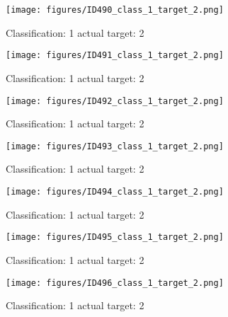\begin{figure}[h!]
\begin{center}
\texttt{[image: figures/ID490\_class\_1\_target\_2.png]}
\end{center}
\caption{ Classification: 1 actual target: 2}
\label{fig:ID490_class_1_target_2}
\end{figure}
\begin{figure}[h!]
\begin{center}
\texttt{[image: figures/ID491\_class\_1\_target\_2.png]}
\end{center}
\caption{ Classification: 1 actual target: 2}
\label{fig:ID491_class_1_target_2}
\end{figure}
\begin{figure}[h!]
\begin{center}
\texttt{[image: figures/ID492\_class\_1\_target\_2.png]}
\end{center}
\caption{ Classification: 1 actual target: 2}
\label{fig:ID492_class_1_target_2}
\end{figure}
\begin{figure}[h!]
\begin{center}
\texttt{[image: figures/ID493\_class\_1\_target\_2.png]}
\end{center}
\caption{ Classification: 1 actual target: 2}
\label{fig:ID493_class_1_target_2}
\end{figure}
\begin{figure}[h!]
\begin{center}
\texttt{[image: figures/ID494\_class\_1\_target\_2.png]}
\end{center}
\caption{ Classification: 1 actual target: 2}
\label{fig:ID494_class_1_target_2}
\end{figure}
\begin{figure}[h!]
\begin{center}
\texttt{[image: figures/ID495\_class\_1\_target\_2.png]}
\end{center}
\caption{ Classification: 1 actual target: 2}
\label{fig:ID495_class_1_target_2}
\end{figure}
\begin{figure}[h!]
\begin{center}
\texttt{[image: figures/ID496\_class\_1\_target\_2.png]}
\end{center}
\caption{ Classification: 1 actual target: 2}
\label{fig:ID496_class_1_target_2}
\end{figure}
